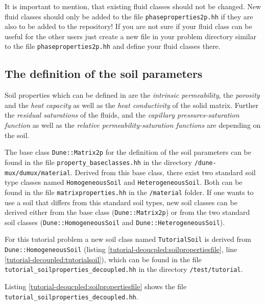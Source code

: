 It is important to mention, that existing fluid classes should not be changed. New fluid classes should only be added to the file \texttt{phaseproperties2p.hh} if they are also to be added to the repository! If you are not sure if your fluid class can be useful for the other \Dumux users just create a new file in your problem directory similar to the file \texttt{phaseproperties2p.hh} and define your fluid classes there. 

\subsection{The definition of the soil parameters}\label{tutorial-decoupled:description-soil-class}

Soil properties which can be defined in \Dumux are the \textit{intrinsic permeability}, the \textit{porosity} and the \textit{heat capacity} as well as the \textit{heat conductivity} of the solid matrix. Further the \textit{residual saturations} of the fluids, and the \textit{capillary pressures-saturation function} as well as the \textit{relative permeability-saturation functions} are depending on the soil.

The base class \texttt{Dune::Matrix2p} for the definition of the soil parameters can be found in the file \texttt{property\_baseclasses.hh} in the directory \texttt{/dune-mux/dumux/material}. Derived from this base class, there exist two standard soil type classes named \texttt{HomogeneousSoil} and \texttt{HeterogeneousSoil}. Both can be found in the file \texttt{matrixproperties.hh} in the \texttt{/material} folder. If one wants to use a soil that differs from this standard soil types, new soil classes can be derived either from the base class (\texttt{Dune::Matrix2p}) or from the two standard soil classes (\texttt{Dune::HomogeneousSoil} and \texttt{Dune::HeterogeneousSoil}).

For this tutorial problem a new soil class named \texttt{TutorialSoil} is derived from \texttt{Dune::HomogeneousSoil} (listing \ref{tutorial-deoucpled:soilpropertiesfile}, line \ref{tutorial-decoupled:tutorialsoil}), which can be found in the file \texttt{tutorial\_soilproperties\_decoupled.hh} in the directory \texttt{/test/tutorial}.

Listing \ref{tutorial-deoucpled:soilpropertiesfile} shows the file \texttt{tutorial\_soilproperties\_decoupled.hh}.

\begin{lst}\label{tutorial-deoucpled:soilpropertiesfile} \mbox{}

\end{lst}

